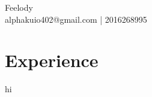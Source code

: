 \documentclass{article}
\begin{document}
\begin{center}
\Huge{Feelody} \\
\normalsize{alphakuio402@gmail.com | 2016268995}
\end{center}
\section*{Experience}
hi
\end{document}
